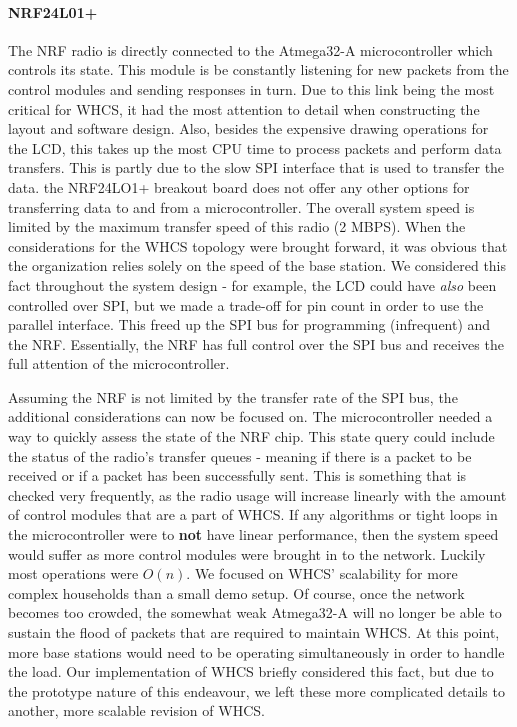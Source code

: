 \paragraph{NRF24L01+}
The NRF radio is directly connected to the Atmega32-A microcontroller
which controls its state. This module is be constantly listening for new
packets from the control modules and sending responses in turn. Due to this
link being the most critical for WHCS, it had the most attention to
detail when constructing the layout and software design. Also, besides the
expensive drawing operations for the LCD, this takes up the most CPU time to
process packets and perform data transfers. This is partly due to the slow SPI
interface that is used to transfer the data. the NRF24LO1+ breakout board
does not offer any other options for transferring data to and from a
microcontroller. The overall system speed is limited by the maximum
transfer speed of this radio (2 MBPS). When the considerations for the WHCS topology were
brought forward, it was obvious that the organization relies solely on the
speed of the base station. We considered this fact throughout the system
design - for example, the LCD could have \emph{also} been controlled over SPI,
but we made a trade-off for pin count in order to use the parallel interface.
This freed up the SPI bus for programming (infrequent) and the NRF.
Essentially, the NRF has full control over the SPI bus and receives the
full attention of the microcontroller. 

Assuming the NRF is not limited by the transfer rate of the SPI bus, the
additional considerations can now be focused on. The microcontroller needed a
way to quickly assess the state of the NRF chip. This state query could include
the status of the radio's transfer queues - meaning if there is a packet to be
received or if a packet has been successfully sent. This is something that is
checked very frequently, as the radio usage will increase linearly
with the amount of control modules that are a part of WHCS. If any algorithms or
tight loops in the microcontroller were to \textbf{not} have linear
performance, then the system speed would suffer as more control modules were
brought in to the network. Luckily most operations were $O(n)$. We focused on WHCS' scalability for more
complex households than a small demo setup. Of course, once the network becomes
too crowded, the somewhat weak Atmega32-A will no longer be able to sustain the
flood of packets that are required to maintain WHCS. At this point, more base
stations would need to be operating simultaneously in order to handle the load.
Our implementation of WHCS briefly considered this fact, but due to the
prototype nature of this endeavour, we left these more complicated details
to another, more scalable revision of WHCS.

